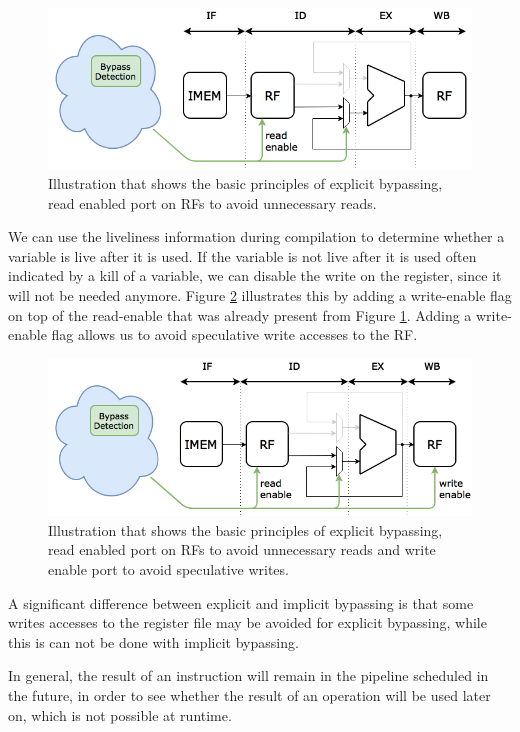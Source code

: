 \begin{figure}[H]
\centering
\includegraphics[width=.7\textwidth]{figures/expl_bypassing_principle/01_explicit_bypassing_principle}
\caption{Illustration that shows the basic principles of explicit bypassing, read enabled port on RFs to avoid unnecessary reads.}
\label{fig:exp_bypass_principle_r}
\end{figure}

We can use the liveliness information during compilation to determine whether a variable is live after it is used. If the variable is not live after it is used often indicated by a kill of a variable, we can disable the write on the register, since it will not be needed anymore. Figure \ref{fig:exp_bypass_principle_rw} illustrates this by adding a write-enable flag on top of the read-enable that was already present from Figure \ref{fig:exp_bypass_principle_r}. Adding a write-enable flag allows us to avoid speculative write accesses to the RF.

\begin{figure}[t]
\centering
\includegraphics[width=.7\textwidth]{figures/expl_bypassing_principle/02_explicit_bypassing_principle}
\caption{Illustration that shows the basic principles of explicit bypassing, read enabled port on RFs to avoid unnecessary reads and write enable port to avoid speculative writes.}
\label{fig:exp_bypass_principle_rw}
\end{figure}

A significant difference between explicit and implicit bypassing is that some writes accesses to the register file may be avoided for explicit bypassing, while this is can not be done with implicit bypassing.

In general, the result of an instruction will remain in the pipeline  scheduled in the future, in order to see whether the result of an operation will be used later on, which is not possible at runtime.

